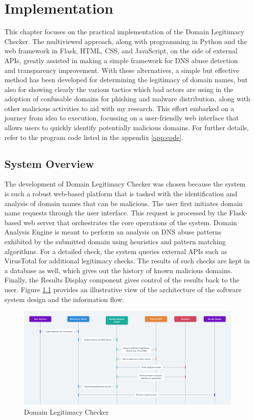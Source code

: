 \chapter{Implementation}


This chapter focuses on the practical implementation of the Domain Legitimacy Checker. The multiviewed approach, along with programming in Python and the web framework in Flask, HTML, CSS, and JavaScript, on the side of external APIs, greatly assisted in making a simple framework for DNS abuse detection and transparency improvement. With these alternatives, a simple but effective method has been developed for determining the legitimacy of domain names, but also for showing clearly the various tactics which bad actors are using in the adoption of confusable domains for phishing and malware distribution, along with other malicious activities to aid with my research. This effort embarked on a journey from idea to execution, focussing on a user-friendly web interface that allows users to quickly identify potentially malicious domains. For further details, refer to the program code listed in the appendix \ref{app:code}.

\section{System Overview}

The development of Domain Legitimacy Checker was chosen because the system is such a robust web-based platform that is tasked with the identification and analysis of domain names that can be malicious. The user first initiates domain name requests through the user interface. This request is processed by the Flask-based web server that orchestrates the core operations of the system. Domain Analysis Engine is meant to perform an analysis on DNS abuse patterns exhibited by the submitted domain using heuristics and pattern matching algorithms. For a detailed check, the system queries external APIs such as VirusTotal for additional legitimacy checks. The results of such checks are kept in a database as well, which gives out the history of known malicious domains. Finally, the Results Display component gives control of the results back to the user. Figure \ref{fig:figfig} provides an illustrative view of the architecture of the software system design and the information flow.


\begin{figure}[H]
\captionsetup{font= footnotesize}
    \centering
    \includegraphics[width=1\linewidth]{project/DNS Abuse Transparency System.png}
    \caption{Domain Legitimacy Checker}
    \label{fig:figfig}
\end{figure}

